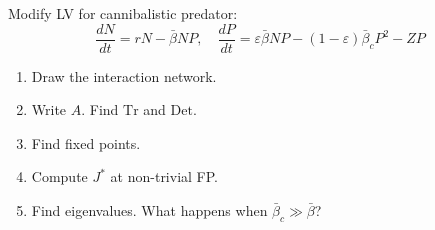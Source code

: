 \documentclass[10pt]{article}
\begin{document}
\begin{problem}
Modify LV for cannibalistic predator:
\[
\frac{dN}{dt} = rN - \bar\beta NP, \quad \frac{dP}{dt} = \varepsilon\bar\beta NP - (1-\varepsilon)\bar\beta_c P^2 - ZP
\]
\begin{enumerate}[label=(\alph*)]
\item Draw the interaction network.
\item Write $A$. Find $\text{Tr}$ and $\text{Det}$.
\item Find fixed points.
\item Compute $J^*$ at non-trivial FP.
\item Find eigenvalues. What happens when $\bar\beta_c \gg \bar\beta$?
\end{enumerate}
\end{problem}
\end{document}
